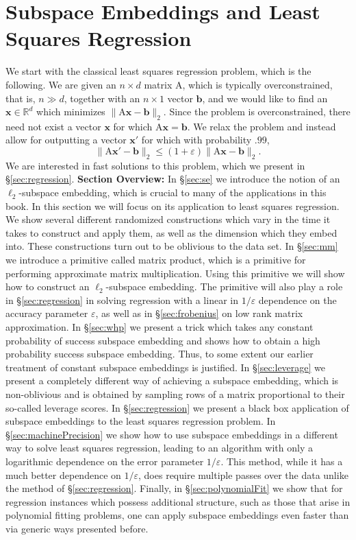 \documentclass[11pt]{article}
\newcommand{\mat}[1]{{\ensuremath{\bm{\mathrm{#1}}}}}
\def\b{{\mathbf b}}
\def\matA{\mat{A}}
\def\x{{\mathbf x}}
\def\b{{\mathbf b}}
\newcommand{\eps}{\varepsilon}
\begin{document}
\section{Subspace Embeddings and Least Squares Regression}
We start with the classical least squares regression problem, which is the following. We are
given an $n \times d$ matrix $\matA$, which is typically overconstrained, that is, $n \gg d$, together
with an $n \times 1$ vector $\b$, and we would like to find an $\x \in \mathbb{R}^d$ 
which minimizes $\|\matA \x- \b\|_2$. Since the
problem is overconstrained, there need not exist a vector $\x$ for which $\matA \x= \b$. We
relax the problem and instead allow for outputting a vector $\x'$ for which with probability $.99$, 
$$\|\matA\x'-\b\|_2 \leq (1+\eps) \|\matA \x-\b\|_2.$$
We are interested in fast solutions to this problem, which we present in \S\ref{sec:regression}. 
{\bf Section Overview:} In \S\ref{sec:se} we introduce the notion of an $\ell_2$-subspace embedding, which is crucial to many of the applications in this book. In this section we will focus on its application to least squares regression. We show several different randomized constructions which vary in the time it takes to construct and apply them, as well as the dimension which they embed into. These constructions turn out to be oblivious to the data set. In \S\ref{sec:mm} we introduce a primitive called matrix product, which is a primitive for performing approximate matrix multiplication. Using this primitive we will show how to construct an $\ell_2$-subspace embedding. The primitive will also play a role in \S\ref{sec:regression} in solving regression with a linear in $1/\eps$ dependence on the accuracy parameter $\eps$, as well as in \S\ref{sec:frobenius} on low rank matrix approximation. In \S\ref{sec:whp} we present a trick which takes any constant probability of success subspace embedding and shows how to obtain a high probability success subspace embedding. Thus, to some extent our earlier treatment of constant subspace embeddings is justified. In \S\ref{sec:leverage} we present a completely different way of achieving a subspace embedding, which is non-oblivious and is obtained by sampling rows of a matrix proportional to their so-called leverage scores. In \S\ref{sec:regression} we present a black box application of subspace embeddings to the least squares regression problem.  In \S\ref{sec:machinePrecision} we show how to use subspace embeddings in a different way to solve least squares regression, leading to an algorithm with only a logarithmic dependence on the error parameter $1/\eps$. This method, while it has a much better dependence on $1/\eps$, does require multiple passes over the data unlike the method of \S\ref{sec:regression}. Finally, in \S\ref{sec:polynomialFit} we show that for regression instances which possess additional structure, such as those that arise in polynomial fitting problems, one can apply subspace embeddings even faster than via generic ways presented before. 
\end{document}

